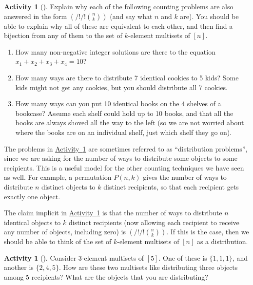 \documentclass[10pt,]{book}
\theoremstyle{plain}
\theoremstyle{definition}
\theoremstyle{definition}
\theoremstyle{definition}
\newtheorem{activity}[project]{Activity}
\theoremstyle{definition}
\numberwithin{equation}{chapter}
\newcommand{\mchoose}[2]{\left(/!/!\binom{#1}{#2}\!\!\right)}
\begin{document}
\begin{activity}[]\label{act-distributionintro}
\hypertarget{p-720}{}%
Explain why each of the following counting problems are also answered in the form \(\mchoose{n}{k}\) (and say what \(n\) and \(k\) are).  You should be able to explain why all of these are equivalent to each other, and then find a bijection from any of them to the set of \(k\)-element multisets of \([n]\).%
\begin{enumerate}[font=\bfseries,label=(\alph*),ref=\alph*]
\item\label{task-87} \hypertarget{p-721}{}%
How many non-negative integer solutions are there to the equation \(x_1 + x_2 + x_3 + x_4 = 10\)?%
\item\label{task-88} \hypertarget{p-722}{}%
How many ways are there to distribute 7 identical cookies to 5 kids? Some kids might not get any cookies, but you should distribute all 7 cookies.%
\item\label{task-89} \hypertarget{p-723}{}%
How many ways can you put 10 identical books on the 4 shelves of a bookcase?  Assume each shelf could hold up to 10 books, and that all the books are always shoved all the way to the left (so we are not worried about where the books are on an individual shelf, just which shelf they go on).%
\end{enumerate}
\end{activity}
\hypertarget{p-724}{}%
The problems in \hyperref[act-distributionintro]{Activity~\ref{act-distributionintro}} are sometimes referred to as ``distribution problems'', since we are asking for the number of ways to distribute some objects to some recipients.   This is a useful model for the other counting techniques we have seen as well.  For example, a permutation \(P(n,k)\) gives the number of ways to distribute \(n\) distinct objects to \(k\) distinct recipients, so that each recipient gets exactly one object.%
\par
\hypertarget{p-725}{}%
The claim implicit in \hyperref[act-distributionintro]{Activity~\ref{act-distributionintro}} is that the number of ways to distribute \(n\) identical objects to \(k\) distinct recipients (now allowing each recipient to receive any number of objects, including zero) is \(\mchoose{n}{k}\).  If this is the case, then we should be able to think of the set of \(k\)-element multisets of \([n]\) as a distribution.%
\begin{activity}[]\label{activity-65}
\hypertarget{p-726}{}%
Consider \(3\)-element multisets of \([5]\).  One of these is \(\{1,1,1\}\), and another is \(\{2,4,5\}\).  How are these two multisets like distributing three objects among 5 recipients?  What are the objects that you are distributing?%
\end{activity}
\end{document}
